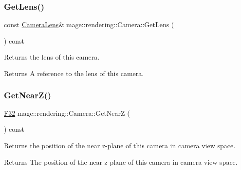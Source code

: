 \subsubsection{\texorpdfstring{Get\+Lens()}{GetLens()}\hspace{0.1cm}{\footnotesize\ttfamily [2/2]}}
{\footnotesize\ttfamily const \hyperlink{classmage_1_1rendering_1_1_camera_lens}{Camera\+Lens}\& mage\+::rendering\+::\+Camera\+::\+Get\+Lens (\begin{DoxyParamCaption}{ }\end{DoxyParamCaption}) const\hspace{0.3cm}{\ttfamily [noexcept]}}

Returns the lens of this camera.

\begin{DoxyReturn}{Returns}
A reference to the lens of this camera. 
\end{DoxyReturn}
\hypertarget{classmage_1_1rendering_1_1_camera_a2c33ca20b544cf126b7984ee46f5b2c3}{}\label{classmage_1_1rendering_1_1_camera_a2c33ca20b544cf126b7984ee46f5b2c3} 
\subsubsection{\texorpdfstring{Get\+Near\+Z()}{GetNearZ()}}
{\footnotesize\ttfamily \hyperlink{namespacemage_aa97e833b45f06d60a0a9c4fc22ae02c0}{F32} mage\+::rendering\+::\+Camera\+::\+Get\+NearZ (\begin{DoxyParamCaption}{ }\end{DoxyParamCaption}) const\hspace{0.3cm}{\ttfamily [noexcept]}}

Returns the position of the near z-\/plane of this camera in camera view space.

\begin{DoxyReturn}{Returns}
The position of the near z-\/plane of this camera in camera view space. 
\end{DoxyReturn}
\hypertarget{classmage_1_1rendering_1_1_camera_abb21116f8a6c7513804431d23fa4cf17}{}\label{classmage_1_1rendering_1_1_camera_abb21116f8a6c7513804431d23fa4cf17} 
